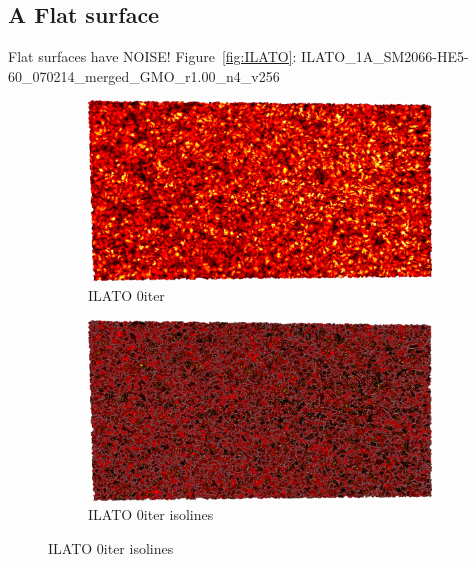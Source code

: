 \subsection{A Flat surface}
Flat surfaces have NOISE!
Figure~\ref{fig:ILATO}: ILATO\_1A\_SM2066-HE5-60\_070214\_merged\_GMO\_r1.00\_n4\_v256
\begin{figure}[ht]
\ffigbox
	{\begin{subfigure}[b]{0.48\linewidth}
		\includegraphics[width=1.0\linewidth,height=0.3\textheight,keepaspectratio]{data/acquired_meshes/ILATO_1A_SM2066-HE5-60_070214_merged_GMO_r1_n4_v256_funcvals_0iter.png}
		\caption{ILATO 0iter}\label{fig:ILATO.a}
	\end{subfigure}
	\begin{subfigure}[b]{0.48\linewidth}
		\includegraphics[width=1.0\linewidth,height=0.3\textheight,keepaspectratio]{data/acquired_meshes/ILATO_1A_SM2066-HE5-60_070214_merged_GMO_r1_n4_v256_funcvals_isolines_0iter.png}
		\caption{ILATO 0iter isolines}\label{fig:ILATO.b}
	\end{subfigure}

}
\end{figure}

